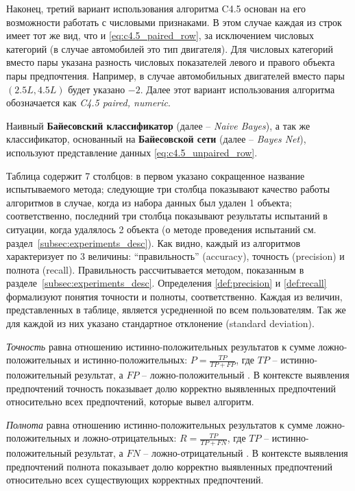 	Наконец, третий вариант использования алгоритма C4.5 основан на его возможности работать с числовыми признаками. В этом случае каждая из строк имеет тот же вид, что и \eqref{eq:c4.5_paired_row}, за исключением числовых категорий (в случае автомобилей это тип двигателя). Для числовых категорий вместо пары указана разность числовых показателей левого и правого объекта пары предпочтения. Например, в случае автомобильных двигателей вместо пары $(2.5L, 4.5L)$ будет указано $-2$. Далее этот вариант использования алгоритма обозначается как \emph{C4.5 paired, numeric}. 
	
	Наивный \textbf{Байесовский классификатор} (далее – \emph{Naive Bayes}), а так же классификатор, основанный на \textbf{Байесовской сети} (далее – \emph{Bayes Net}), используют представление данных \eqref{eq:c4.5_unpaired_row}. 

	Таблица содержит 7 столбцов: в первом указано сокращенное название испытываемого метода; следующие три столбца показывают качество работы алгоритмов в случае, когда из набора данных был удален 1 объекта; соответственно, последний три столбца показывают результаты испытаний в ситуации, когда удалялось 2 объекта (о методе проведения испытаний см. раздел~\ref{subsec:experiments_desc}). Как видно, каждый из алгоритмов характеризует по 3 величины: ``правильность'' (accuracy), точность (precision) и полнота (recall). Правильность рассчитывается методом, показанным в разделе~\ref{subsec:experiments_desc}. Определения \ref{def:precision} и \ref{def:recall} формализуют понятия точности и полноты, соответственно. Каждая из величин, представленных в таблице, является усредненной по всем пользователям. Так же для каждой из них указано стандартное отклонение (standard deviation).
	
	\begin{definition}
		\label{def:precision}
		\emph{Точность} равна отношению истинно-положительных результатов к сумме ложно-положительных и истинно-положительных: $P = \frac{TP}{TP + FP}$, где $TP$ – истинно-положительный результат, а $FP$ – ложно-положительный \cite[с.~155]{Manning:2008}. В контексте выявления предпочтений точность показывает долю корректно выявленных предпочтений относительно всех предпочтений, которые вывел алгоритм.
	\end{definition}
	
	\begin{definition}
		\label{def:recall}
		\emph{Полнота} равна отношению истинно-положительных результатов к сумме ложно-положительных и ложно-отрицательных: $R = \frac{TP}{TP + FN}$, где $TP$ – истинно-положительный результат, а $FN$ – ложно-отрицательный \cite[с.~155]{Manning:2008}. В контексте выявления предпочтений полнота показывает долю корректно выявленных предпочтений относительно всех существующих корректных предпочтений.
	\end{definition}
	
